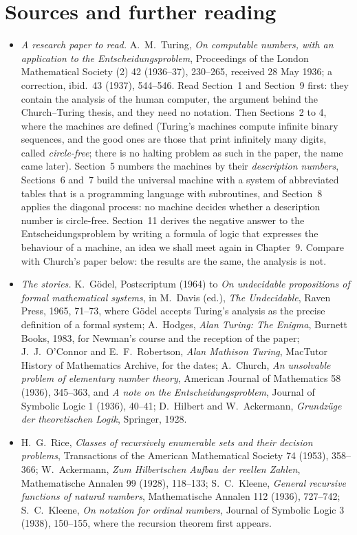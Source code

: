 \section*{Sources and further reading}

\begin{itemize}
\item \emph{A research paper to read.} A.~M.~Turing, \emph{On computable numbers, with an application to the Entscheidungsproblem}, Proceedings of the London Mathematical Society (2) 42 (1936--37), 230--265, received 28 May 1936; a correction, ibid.\ 43 (1937), 544--546. Read Section~1 and Section~9 first: they contain the analysis of the human computer, the argument behind the Church--Turing thesis, and they need no notation. Then Sections~2 to 4, where the machines are defined (Turing's machines compute infinite binary sequences, and the good ones are those that print infinitely many digits, called \emph{circle-free}; there is no halting problem as such in the paper, the name came later). Section~5 numbers the machines by their \emph{description numbers}, Sections~6 and~7 build the universal machine with a system of abbreviated tables that is a programming language with subroutines, and Section~8 applies the diagonal process: no machine decides whether a description number is circle-free. Section~11 derives the negative answer to the Entscheidungsproblem by writing a formula of logic that expresses the behaviour of a machine, an idea we shall meet again in Chapter~9. Compare with Church's paper below: the results are the same, the analysis is not.
\item \emph{The stories.} K.~Gödel, Postscriptum (1964) to \emph{On undecidable propositions of formal mathematical systems}, in M.~Davis (ed.), \emph{The Undecidable}, Raven Press, 1965, 71--73, where Gödel accepts Turing's analysis as the precise definition of a formal system; A.~Hodges, \emph{Alan Turing: The Enigma}, Burnett Books, 1983, for Newman's course and the reception of the paper; J.~J.~O'Connor and E.~F.~Robertson, \emph{Alan Mathison Turing}, MacTutor History of Mathematics Archive, for the dates; A.~Church, \emph{An unsolvable problem of elementary number theory}, American Journal of Mathematics 58 (1936), 345--363, and \emph{A note on the Entscheidungsproblem}, Journal of Symbolic Logic 1 (1936), 40--41; D.~Hilbert and W.~Ackermann, \emph{Grundzüge der theoretischen Logik}, Springer, 1928.
\item H.~G.~Rice, \emph{Classes of recursively enumerable sets and their decision problems}, Transactions of the American Mathematical Society 74 (1953), 358--366; W.~Ackermann, \emph{Zum Hilbertschen Aufbau der reellen Zahlen}, Mathematische Annalen 99 (1928), 118--133; S.~C.~Kleene, \emph{General recursive functions of natural numbers}, Mathematische Annalen 112 (1936), 727--742; S.~C.~Kleene, \emph{On notation for ordinal numbers}, Journal of Symbolic Logic 3 (1938), 150--155, where the recursion theorem first appears.

\end{itemize}
